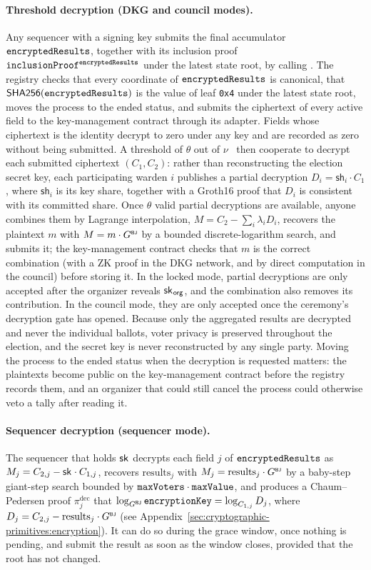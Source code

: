 \paragraph{Threshold decryption (\ac{DKG} and council modes).} Any sequencer with a signing key submits the final accumulator $\texttt{encryptedResults}$, together with its inclusion proof $\texttt{inclusionProof}^{\texttt{encryptedResults}}$ under the latest state root, by calling . The registry checks that every coordinate of $\texttt{encryptedResults}$ is canonical, that ${\sf{SHA256}}(\texttt{encryptedResults})$ is the value of leaf \texttt{0x4} under the latest state root, moves the process to the ended status, and submits the ciphertext of every active field to the key-management contract through its adapter. Fields whose ciphertext is the identity decrypt to zero under any key and are recorded as zero without being submitted. A threshold of $\theta$ out of $\nu$ \keywardens\ then cooperate to decrypt each submitted ciphertext $(C_1, C_2)$: rather than reconstructing the election secret key, each participating warden $i$ publishes a partial decryption $D_i = \mathsf{sh}_i \cdot C_1$, where $\mathsf{sh}_i$ is its key share, together with a Groth16 proof that $D_i$ is consistent with its committed share. Once $\theta$ valid partial decryptions are available, anyone combines them by Lagrange interpolation, $M = C_2 - \sum_i \lambda_i D_i$, recovers the plaintext $m$ with $M = m \cdot {G}^{\text{\tiny \sf BJ}}$ by a bounded discrete-logarithm search, and submits it; the key-management contract checks that $m$ is the correct combination (with a \ac{ZK} proof in the \ac{DKG} network, and by direct computation in the council) before storing it. In the locked mode, partial decryptions are only accepted after the organizer reveals ${\sf{sk}^{}}_{\mathsf{org}}$, and the combination also removes its contribution. In the council mode, they are only accepted once the ceremony's decryption gate has opened. Because only the aggregated results are decrypted and never the individual ballots, voter privacy is preserved throughout the election, and the secret key is never reconstructed by any single party. Moving the process to the ended status when the decryption is requested matters: the plaintexts become public on the key-management contract before the registry records them, and an organizer that could still cancel the process could otherwise veto a tally after reading it.

\paragraph{Sequencer decryption (sequencer mode).} The sequencer that holds ${\sf{sk}^{}}$ decrypts each field $j$ of $\texttt{encryptedResults}$ as $M_j = C_{2,j} - {\sf{sk}^{}} \cdot C_{1,j}$, recovers $\text{results}_j$ with $M_j = \text{results}_j \cdot {G}^{\text{\tiny \sf BJ}}$ by a baby-step giant-step search bounded by $\texttt{maxVoters} \cdot \texttt{maxValue}$, and produces a Chaum--Pedersen proof $\pi^{\mathrm{dec}}_j$ that $\log_{{G}^{\text{\tiny \sf BJ}}} \texttt{encryptionKey} = \log_{C_{1,j}} D_j$, where $D_j = C_{2,j} - \text{results}_j \cdot {G}^{\text{\tiny \sf BJ}}$ (see Appendix~\ref{sec:cryptographic-primitives:encryption}). It can do so during the grace window, once nothing is pending, and submit the result as soon as the window closes, provided that the root has not changed.

